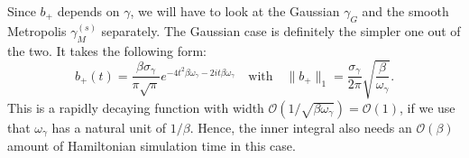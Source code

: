 Since $b_+$ depends on $\gamma$, we will have to look at the Gaussian $\gamma_G$ and the smooth Metropolis $\gamma_M^{(s)}$ separately. The Gaussian case is definitely the simpler one out of the two. It takes the following form:
\begin{equation} \label{eq:b_plus-gauss}
    b_+(t) = \frac{ \beta\sigma_\gamma}{\pi\sqrt{\pi}}e^{-4t^2\beta \omega_\gamma - 2it\beta\omega_\gamma} \quad\text{with}\quad \|b_+\|_1 = \frac{\sigma_\gamma}{2\pi} \sqrt{\frac{\beta}{\omega_\gamma}}.
\end{equation}
This is a rapidly decaying function with width $\mathcal{O}(1 / \sqrt{\beta \omega_\gamma}) = \mathcal{O}(1)$, if we use that $\omega_\gamma$ has a natural unit of $1 / \beta$. Hence, the inner integral also needs an $\mathcal{O}(\beta)$ amount of Hamiltonian simulation time in this case.

